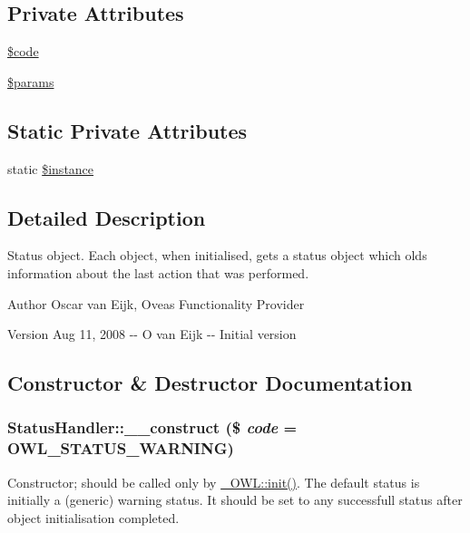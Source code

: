 \subsection*{Private Attributes}
\begin{DoxyCompactItemize}
\item 
\hyperlink{classStatusHandler_ab74e826d2401345eb20b11fe7d78aa45}{\$code}
\item 
\hyperlink{classStatusHandler_a599f9c9284340399fdcb7dac9cb7856f}{\$params}
\end{DoxyCompactItemize}
\subsection*{Static Private Attributes}
\begin{DoxyCompactItemize}
\item 
static \hyperlink{classStatusHandler_a93400d190e7612dd53fbf0be529a96ee}{\$instance}
\end{DoxyCompactItemize}


\subsection{Detailed Description}
Status object. Each object, when initialised, gets a status object which olds information about the last action that was performed. \begin{DoxyAuthor}{Author}
Oscar van Eijk, Oveas Functionality Provider 
\end{DoxyAuthor}
\begin{DoxyVersion}{Version}
Aug 11, 2008 -\/-\/ O van Eijk -\/-\/ Initial version 
\end{DoxyVersion}


\subsection{Constructor \& Destructor Documentation}
\subsubsection[{\_\-\_\-construct}]{\setlength{\rightskip}{0pt plus 5cm}StatusHandler::\_\-\_\-construct (\$ {\em code} = {\ttfamily OWL\_\-STATUS\_\-WARNING})}\label{classStatusHandler_a5cb2ad461aa4afc7ec9115c176eb354e}
Constructor; should be called only by \hyperlink{class__OWL_ae0ef3ded56e8a6b34b6461e5a721cd3e}{\_\-OWL::init()}. The default status is initially a (generic) warning status. It should be set to any successfull status after object initialisation completed.



